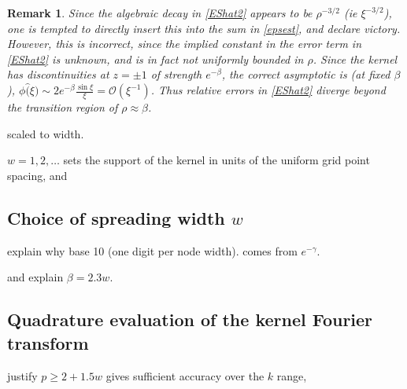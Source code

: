 \documentclass[10pt]{article}
\newcommand{\bigO}{{\mathcal O}}
\newtheorem{rmk}[thm]{Remark}
\newcommand{\freq}{\beta}          %
\begin{document}
\begin{rmk}
Since the algebraic decay in \eqref{EShat2} appears to be
$\rho^{-3/2}$ (ie $\xi^{-3/2}$), one is tempted to
directly insert this into the sum in \eqref{epsest},
and declare victory.
However, this is incorrect, since the implied constant in the error
term in \eqref{EShat2} is unknown, and is in fact not uniformly bounded
in $\rho$.
Since the kernel has discontinuities at $z=\pm 1$ of strength $e^{-\freq}$,
the correct asymptotic is (at fixed $\freq$),
$\phi\hat(\xi) \sim 2 e^{-\freq} \frac{\sin \xi}{\xi} = \bigO(\xi^{-1})$.
Thus relative errors in \eqref{EShat2} diverge beyond the transition
region of $\rho \approx \freq$.
\label{r:decay}
\end{rmk}







scaled to width.

$w=1,2,\ldots$
sets the support of the kernel in units of the uniform grid point spacing, and






\subsection{Choice of spreading width $w$}
\label{s:w}

explain why base 10 (one digit per node width).
comes from $e^{-\gamma}$.

and explain $\beta = 2.3 w$.


\subsection{Quadrature evaluation of the kernel Fourier transform}
\label{s:p}

justify  $p\ge 2+1.5 w$ gives sufficient accuracy
over the $k$ range,
\end{document}
